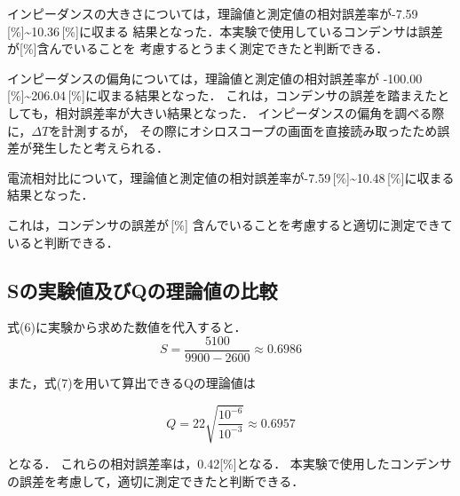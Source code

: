 インピーダンスの大きさについては，理論値と測定値の相対誤差率が-7.59\,[\%]\sim10.36\,[\%]に収まる
結果となった．本実験で使用しているコンデンサは誤差が[\%]含んでいることを
考慮するとうまく測定できたと判断できる．

インピーダンスの偏角については，理論値と測定値の相対誤差率が
-100.00\,[\%]\sim206.04\,[\%]に収まる結果となった．
これは，コンデンサの誤差を踏まえたとしても，相対誤差率が大きい結果となった．
インピーダンスの偏角を調べる際に，$\Delta T$を計測するが，
その際にオシロスコープの画面を直接読み取ったため誤差が発生したと考えられる．

電流相対比について，理論値と測定値の相対誤差率が-7.59\,[\%]\sim10.48\,[\%]に収まる結果となった．

これは，コンデンサの誤差が\,[\%]
含んでいることを考慮すると適切に測定できていると判断できる．

\subsection{Sの実験値及びQの理論値の比較}
式(6)に実験から求めた数値を代入すると．
$$
S=\frac{5100}{9900-2600}\approx 0.6986
$$

また，式(7)を用いて算出できるQの理論値は

$$
Q=22\sqrt{\frac{10^{-6}}{10^{-3}}}\approx 0.6957
$$

となる．
これらの相対誤差率は，0.42[\%]となる．
本実験で使用したコンデンサの誤差を考慮して，適切に測定できたと判断できる．
